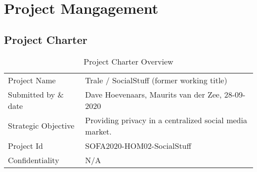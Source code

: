 \chapter{Project Mangagement}\label{ch:project-mangagement}

\section{Project Charter}

\begin{table}[]
    \begin{tabular}{ll}
        Project Name         & Trale / SocialStuff (former working title)              \\
        Submitted by \& date & Dave Hoevenaars, Maurits van der Zee, 28-09-2020        \\
        Strategic Objective  & Providing privacy in a centralized social media market. \\
        Project Id           & SOFA2020-HOM02-SocialStuff                              \\
        Confidentiality      & N/A
    \end{tabular}
    \caption{Project Charter Overview}
    \label{tab:my-table}
\end{table}



